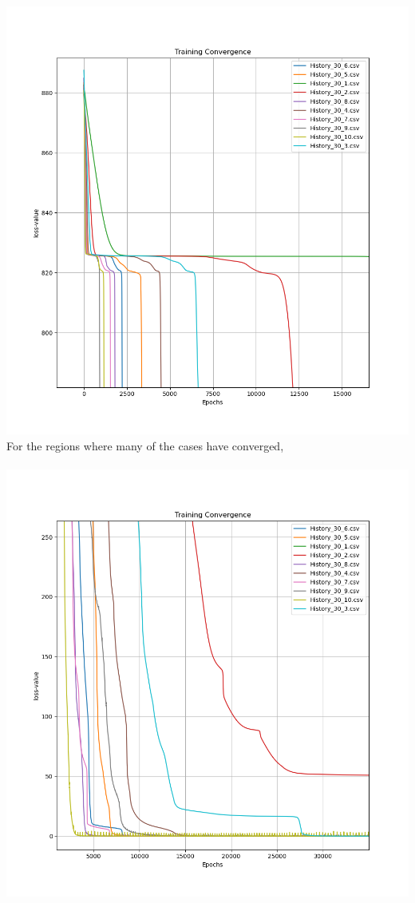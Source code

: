 \documentclass[a4paper, 12pt]{report}
\def\size{0.75}
\begin{document}
\begin{center}
\\~\\\includegraphics[scale=\size]{Width_30_Beginning.png}
\newpage
For the regions where many of the cases have converged,
\\~\\\includegraphics[scale=\size]{Width_30_Down.png}
\newpage

\end{center}
\end{document}
